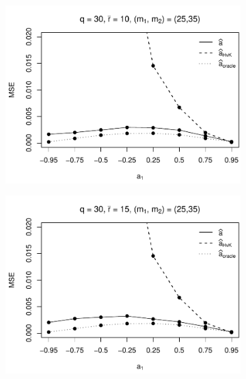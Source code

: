 \begin{figure}[p]
\begin{subfigure}[b]{0.45\textwidth}
\includegraphics[width=\textwidth]{Plots/Robustness/MSE_a1_zoomed_T=500_slope=10_(q,r,M1,M2)=(30,10,25,35).pdf}
\end{subfigure}
\hspace{0.25cm}
\begin{subfigure}[b]{0.45\textwidth}
\includegraphics[width=\textwidth]{Plots/Robustness/MSE_a1_zoomed_T=500_slope=10_(q,r,M1,M2)=(30,15,25,35).pdf}
\end{subfigure}


\end{figure}
